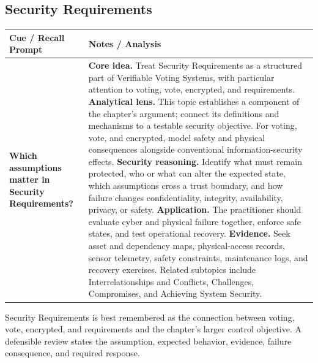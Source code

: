 \documentclass[11pt]{article}
\newcommand{\CornellHeader}{%
\rowcolor{Navy}\color{white}\bfseries Cue / Recall Prompt & \color{white}\bfseries Notes / Analysis\\\hline}
\newcommand{\CornellRow}[2]{%
\cellcolor{CueGray}\RaggedRight\textbf{#1} & \RaggedRight #2\\\hline}
\begin{document}
\subsection*{Security Requirements}
\begin{longtable}{>{\RaggedRight\arraybackslash}p{}|>{\RaggedRight\arraybackslash}p{}}
\CornellHeader
\CornellRow{Which assumptions matter in Security Requirements?}{\textbf{Core idea.} Treat Security Requirements as a structured part of Verifiable Voting Systems, with particular attention to voting, vote, encrypted, and requirements. \textbf{Analytical lens.} This topic establishes a component of the chapter's argument; connect its definitions and mechanisms to a testable security objective. For voting, vote, and encrypted, model safety and physical consequences alongside conventional information-security effects. \textbf{Security reasoning.} Identify what must remain protected, who or what can alter the expected state, which assumptions cross a trust boundary, and how failure changes confidentiality, integrity, availability, privacy, or safety. \textbf{Application.} The practitioner should evaluate cyber and physical failure together, enforce safe states, and test operational recovery. \textbf{Evidence.} Seek asset and dependency maps, physical-access records, sensor telemetry, safety constraints, maintenance logs, and recovery exercises. Related subtopics include Interrelationships and Conflicts, Challenges, Compromises, and Achieving System Security.}
\end{longtable}
\begin{topicsummary}
Security Requirements is best remembered as the connection between voting, vote, encrypted, and requirements and the chapter's larger control objective. A defensible review states the assumption, expected behavior, evidence, failure consequence, and required response.
\end{topicsummary}
\end{document}
